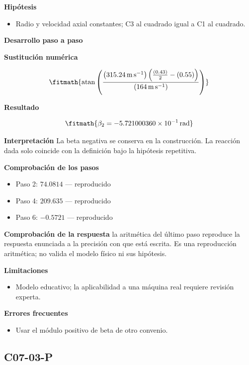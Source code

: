 \documentclass[10pt,openany]{book}
\begin{document}
\noindent\textbf{Hipótesis}
\begin{itemize}
\item Radio y velocidad axial constantes; C3 al cuadrado igual a C1 al cuadrado.
\end{itemize}

\noindent\textbf{Desarrollo paso a paso}



\noindent\textbf{Sustitución numérica}

\[
\fitmath{\operatorname{atan}{\left(\frac{\left(315.24\,\mathrm{m}\,\mathrm{s}^{-1}\right) \left(\frac{\left(0.43\right)}{2} - \left(0.55\right)\right)}{\left(164\,\mathrm{m}\,\mathrm{s}^{-1}\right)} \right)}}
\]

\noindent\textbf{Resultado}

\[
\fitmath{\beta_2=-5.721000360\times10^{-1}\,\mathrm{rad}}
\]

\noindent\textbf{Interpretación}
La beta negativa se conserva en la construcción. La reacción dada solo coincide con la definición bajo la hipótesis repetitiva.

\noindent\textbf{Comprobación de los pasos}
\begin{itemize}
\item Paso 2: $74.0814$ — reproducido
\item Paso 4: $209.635$ — reproducido
\item Paso 6: $-0.5721$ — reproducido
\end{itemize}

\noindent\textbf{Comprobación de la respuesta} la aritmética del último paso reproduce la respuesta enunciada a la precisión con que está escrita. Es una reproducción aritmética; no valida el modelo físico ni sus hipótesis.

\noindent\textbf{Limitaciones}
\begin{itemize}
\item Modelo educativo; la aplicabilidad a una máquina real requiere revisión experta.
\end{itemize}

\noindent\textbf{Errores frecuentes}
\begin{itemize}
\item Usar el módulo positivo de beta de otro convenio.
\end{itemize}
\subsection*{C07-03-P}
\end{document}

